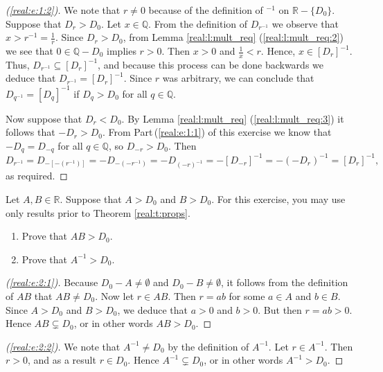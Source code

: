 \begin{proof}[(\ref{real:e:1:2})]
	We note that $r \neq 0$ because of the definition of ${ }^{-1}$ on $\mathbb{R} - \{ D_0 \}$. Suppose that $D_r > D_0$. Let $x \in \mathbb{Q}$. From the definition of $D_{r^{-1}}$ we observe that $x > r^{-1} = \frac{1}{r}$. Since $D_r > D_0$, from Lemma \ref{real:l:mult_req} (\ref{real:l:mult_req:2}) we see that $0 \in \mathbb{Q} - D_0$ implies $r > 0$. Then $x > 0$ and $\frac{1}{x} < r$. Hence, $x \in [D_r]^{-1}$. Thus, $D_{r^{-1}} \subseteq [D_r]^{-1}$, and because this process can be done backwards we deduce that $D_{r^{-1}} = [D_r]^{-1}$. Since $r$ was arbitrary, we can conclude that $D_{q^{-1}} = [D_q]^{-1}$ if $D_q > D_0$ for all $q \in \mathbb{Q}$.

	Now suppose that $D_r < D_0$. By Lemma \ref{real:l:mult_req} (\ref{real:l:mult_req:3}) it follows that $-D_r > D_0$. From Part\,(\ref{real:e:1:1}) of this exercise we know that $-D_q = D_{-q}$ for all $q \in \mathbb{Q}$, so $D_{-r} > D_0$. Then
	$$
		D_{r^{-1}} = D_{-[-(r^{-1})]} = -D_{-(-r^{-1})} = -D_{(-r)^{-1}} = -[D_{-r}]^{-1} = -(-D_r)^{-1} = [D_r]^{-1},
	$$
	as required.
\end{proof}


\Newpage
\begin{exercise} %
	\label{real:e:2}
	Let $A, B \in \mathbb{R}$. Suppose that $A > D_0$ and $B > D_0$. For this exercise, you may use only results prior to Theorem \ref{real:t:props}.
	\begin{enumerate}
		\item \label{real:e:2:1}
		      Prove that $A B > D_0$.
		\item \label{real:e:2:2}
		      Prove that $A^{-1} > D_0$.
	\end{enumerate}
\end{exercise}

\begin{proof}[(\ref{real:e:2:1})]
	Because $D_0 - A \neq \emptyset$ and $D_0 - B \neq \emptyset$, it follows from the definition of $A B$ that $A B \neq D_0$. Now let $r \in A B$. Then $r = a b$ for some $a \in A$ and $b \in B$. Since $A > D_0$ and $B > D_0$, we deduce that $a > 0$ and $b > 0$. But then $r = a b > 0$. Hence $A B \subsetneq D_0$, or in other words $A B > D_0$.
\end{proof}

\begin{proof}[(\ref{real:e:2:2})]
	We note that $A^{-1} \neq D_0$ by the definition of $A^{-1}$. Let $r \in A^{-1}$. Then $r > 0$, and as a result $r \in D_0$. Hence $A^{-1} \subsetneq D_0$, or in other words $A^{-1} > D_0$.
\end{proof}


